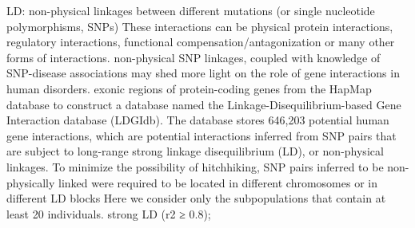 LD: non-physical linkages between different mutations (or single nucleotide polymorphisms, SNPs)  \cite{wang2012ldgidb}
These interactions can be physical protein interactions, regulatory interactions, functional compensation/antagonization or many other forms of interactions.  \cite{wang2012ldgidb}
non-physical SNP linkages, coupled with knowledge of SNP-disease associations may shed more light on the role of gene interactions in human disorders. \cite{wang2012ldgidb}
exonic regions of protein-coding genes from the HapMap database to construct a database named the Linkage-Disequilibrium-based Gene Interaction database (LDGIdb). The database stores 646,203 potential human gene interactions, which are potential interactions inferred from SNP pairs that are subject to long-range strong linkage disequilibrium (LD), or non-physical linkages. To minimize the possibility of hitchhiking, SNP pairs inferred to be non-physically linked were required to be located in different chromosomes or in different LD blocks  \cite{wang2012ldgidb}
Here we consider only the subpopulations that contain at least 20 individuals. \cite{wang2012ldgidb}
strong LD (r2 ≥ 0.8); \cite{wang2012ldgidb}


